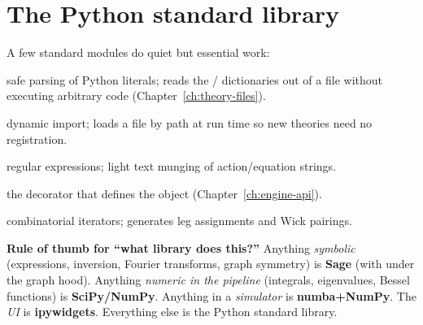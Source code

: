 \section{The Python standard library}
A few standard modules do quiet but essential work:
\begin{description}[leftmargin=1.2em]
  \item[\code{ast}] safe parsing of Python literals; 
        reads the / dictionaries out of
        a  file without executing arbitrary code
        (Chapter~\ref{ch:theory-files}).
  \item[\code{importlib}] dynamic import; loads a  file by path
        at run time so new theories need no registration.
  \item[\code{re}] regular expressions; light text munging of action/equation
        strings.
  \item[\code{dataclasses}] the  decorator that defines the
         object (Chapter~\ref{ch:engine-api}).
  \item[\code{itertools}] combinatorial iterators;  generates leg
        assignments and Wick pairings.
\end{description}

\begin{note}
\textbf{Rule of thumb for ``what library does this?''}  Anything
\emph{symbolic} (expressions, inversion, Fourier transforms, graph symmetry) is
\textbf{Sage} (with  under the graph hood).  Anything
\emph{numeric in the pipeline} (integrals, eigenvalues, Bessel functions) is
\textbf{SciPy/NumPy}.  Anything in a \emph{simulator} is \textbf{numba+NumPy}.
The \emph{UI} is \textbf{ipywidgets}.  Everything else is the Python standard
library.
\end{note}

